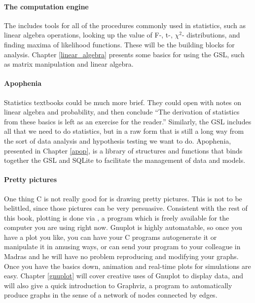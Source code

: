 \paragraph{The computation engine} The 
includes tools for all of the procedures commonly used in statistics,
such as linear algebra operations, looking up the value of F-, t-, $\chi^2$-
distributions, and finding maxima of likelihood functions. These
will be the building blocks for analysis. Chapter \ref{linear_algebra}
presents some basics for using the GSL, such as matrix manipulation and
linear algebra.

\paragraph{Apophenia}
Statistics textbooks could be much more brief. They could open
with notes on linear algebra and probability, and then conclude ``The
derivation of statistics from these basics is left as an exercise for
the reader.'' Similarly, the GSL includes all that we need to do
statistics, but in a raw form that is still a long way from the
sort of data analysis and hypothesis testing we want to do. Apophenia,
presented in Chapter \ref{apop}, is a library of structures and functions
that binds together the GSL and SQLite to facilitate the management of
data and models.

\paragraph{Pretty pictures} One thing C is not really good for is drawing
pretty pictures. This is not to be belittled, since those pictures
can be very persuasive. Consistent with the rest of this book, plotting
is done via , a program which is freely available for
the computer you are using right now. Gnuplot is highly automatable, so once
you have a plot you like, you can have your C programs autogenerate
it or manipulate it in amusing ways, or can send your program to your
colleague in Madras and he will have no problem reproducing and modifying
your graphs. Once you have the basics down, animation and real-time
plots for simulations are easy. Chapter \ref{gnuplot} will cover creative uses of
Gnuplot to display data, and will also give a quick introduction to
Graphviz, a program to automatically produce graphs in the sense of a network of nodes
connected by edges.






